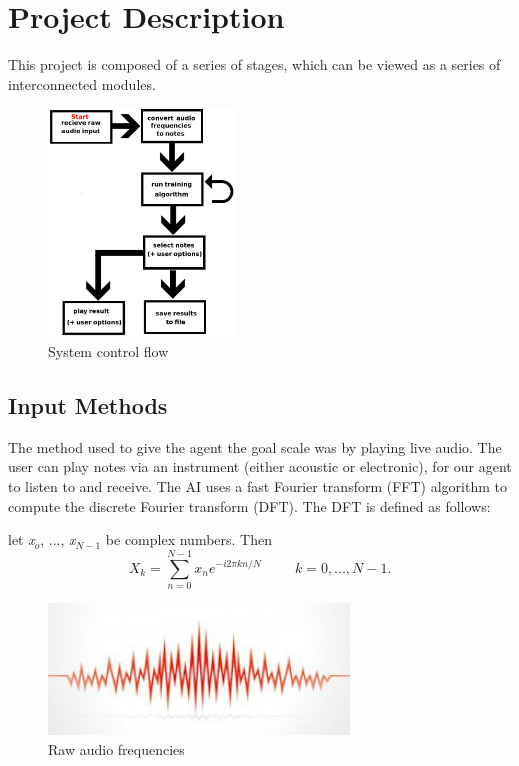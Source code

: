 \documentclass{chi2009}
\begin{document}
\section{Project Description}

This project is composed of a series of stages, which can be viewed as a series of interconnected modules.

\begin{figure}[htp]
\centering
\includegraphics[width=5cm]{tmp}
\caption{System control flow}
\label{fig:controlflow}
\end{figure}


\subsection{Input Methods}

The method used to give the agent the goal scale was by playing live audio.  The user can play notes via an instrument (either acoustic or electronic), for our agent to listen to and receive.  The AI uses a fast Fourier transform (FFT) algorithm to compute the discrete Fourier transform (DFT).  The DFT is defined as follows:

let \textit{x}$_o$, ..., \textit{x}$_{N-1}$ be complex numbers.  Then
$$X_k = \sum_{n=0}^{N-1} x_ne^{-i2\pi kn/N} \hspace{1cm} \textit{k} = 0,...,\textit{N} - 1. $$

\begin{figure}[htp]
\centering
\includegraphics[width=8cm]{audio_wave}
\caption{Raw audio frequencies}
\label{fig:audio wave}
\end{figure}
\end{document}

